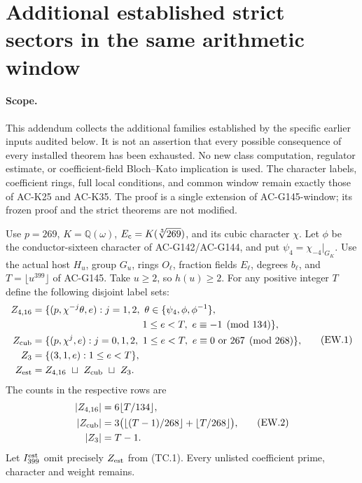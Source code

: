 \section{Additional established strict sectors in the same arithmetic window}
\label{sec:additional-established-window-sectors}

\paragraph{Scope.}
This addendum collects the additional families established by the
specific earlier inputs audited below.  It is not an assertion that
every possible consequence of every installed theorem has been exhausted.
No new class computation, regulator estimate, or coefficient-field
Bloch--Kato implication is used.
The character labels, coefficient rings, full local conditions, and
common window remain exactly those of AC-K25 and AC-K35.
The proof is a single extension of AC-G145-window; its frozen proof
and the strict theorems are not modified.

Use $p=269$, $K=\mathbb Q(\omega)$, $E_{\rm c}=K(\sqrt[3]{269})$,
and its cubic character $\chi$.
Let $\phi$ be the conductor-sixteen character of AC-G142/AC-G144,
and put $\psi_4=\chi_{-4}|_{G_K}$.
Use the actual host $H_u$, group $G_u$, rings $O_\ell$, fraction
fields $E_\ell$, degrees $b_\ell$, and $T=\lfloor u^{399}\rfloor$
of AC-G145.  Take $u\geq2$, so $h(u)\geq2$.
For any positive integer $T$ define the following disjoint label sets:
\[
 \begin{aligned}
 Z_{4,16}={}&\{(p,\chi^{-j}\theta,e):
       j=1,2,\ \theta\in\{\psi_4,\phi,\phi^{-1}\},\\
       &\hspace{35mm}1\leq e<T,\ e\equiv-1\pmod{134}\},\\
 Z_{\rm cub}={}&\{(p,\chi^j,e):
       j=0,1,2,\ 1\leq e<T,\ e\equiv0\text{ or }267\pmod{268}\},\\
 Z_3={}&\{(3,1,e):1\leq e<T\},\\
 Z_{\rm est}={}&Z_{4,16}\ \sqcup\ Z_{\rm cub}\ \sqcup\ Z_3 .
 \end{aligned}
 \tag{EW.1}
\]
The counts in the respective rows are
\[
 \begin{aligned}
 |Z_{4,16}|&=6\lfloor T/134\rfloor,\\
 |Z_{\rm cub}|&=
       3\bigl(\lfloor(T-1)/268\rfloor+\lfloor T/268\rfloor\bigr),\\
 |Z_3|&=T-1 .
 \end{aligned}
 \tag{EW.2}
\]
Let $I_{399}^{\rm est}$ omit precisely $Z_{\rm est}$ from (TC.1).
Every unlisted coefficient prime, character and weight remains.

